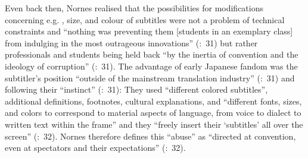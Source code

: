 Even back then, Nornes realised that the possibilities for modifications concerning e.g. , size, and colour of subtitles were not a problem of technical constraints and “nothing was preventing them [students in an exemplary class] from indulging in the most outrageous innovations” (\citeyear{nornes1999}:~31) but rather professionals and students being held back “by the inertia of convention and the ideology of corruption” (\citeyear{nornes1999}:~31). The advantage of early Japanese  fandom was the subtitler’s position “outside of the mainstream translation industry” (\citeyear{nornes1999}:~31) and following their “instinct” (\citeyear{nornes1999}:~31): They used “different colored subtitles”, additional definitions, footnotes, cultural explanations, and “different fonts, sizes, and colors to correspond to material aspects of language, from voice to dialect to written text within the frame” and they “freely insert their ‘subtitles’ all over the screen” (\citeyear{nornes1999}:~32). Nornes therefore defines this “abuse” as “directed at convention, even at spectators and their expectations” (\citeyear{nornes1999}:~32).

